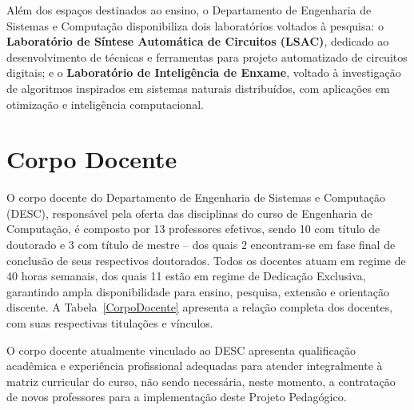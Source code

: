Além dos espaços destinados ao ensino, o Departamento de Engenharia de Sistemas e Computação disponibiliza dois laboratórios voltados à pesquisa: o \textbf{Laboratório de Síntese Automática de Circuitos (LSAC)}, dedicado ao desenvolvimento de técnicas e ferramentas para projeto automatizado de circuitos digitais; e o \textbf{Laboratório de Inteligência de Enxame}, voltado à investigação de algoritmos inspirados em sistemas naturais distribuídos, com aplicações em otimização e inteligência computacional.
\section{Corpo Docente}

O corpo docente do Departamento de Engenharia de Sistemas e Computação (DESC), responsável pela oferta das disciplinas do curso de Engenharia de Computação, é composto por 13 professores efetivos, sendo 10 com título de doutorado e 3 com título de mestre – dos quais 2 encontram-se em fase final de conclusão de seus respectivos doutorados. Todos os docentes atuam em regime de 40 horas semanais, dos quais 11 estão em regime de Dedicação Exclusiva, garantindo ampla disponibilidade para ensino, pesquisa, extensão e orientação discente. A Tabela~\ref{CorpoDocente} apresenta a relação completa dos docentes, com suas respectivas titulações e vínculos.

O corpo docente atualmente vinculado ao DESC apresenta qualificação acadêmica e experiência profissional adequadas para atender integralmente à matriz curricular do curso, não sendo necessária, neste momento, a contratação de novos professores para a implementação deste Projeto Pedagógico.


